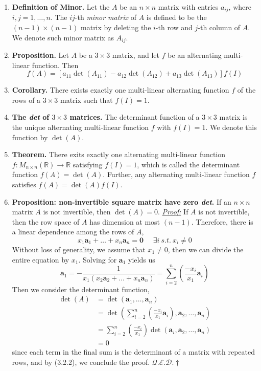\documentclass[oneside, 12pt]{book}
\newcommand{\settag}[1]{\renewcommand{\theenumi}{#1}}
\newcommand{\R}{\mathbb{R}}
\newcommand{\qed}{\hfill $\mathcal{Q}.\mathcal{E}.\mathcal{D}.\dagger$}
\newcommand{\tbf}[1]{\textbf{#1}}
\newcommand{\tit}[1]{\textit{#1}}
\newcommand{\proof}{\tit{\underline{Proof:}}} %
\newcommand{\trans}[3]{$#1:#2\rightarrow{}#3$}
\newcommand{\para}[1]{\item \tbf{#1}}
\newcommand{\va}{\mathbf{a}}
\newcommand{\vzero}{\mathbf{0}}
\begin{document}
\begin{enumerate}
    \settag{3.2.4}
    \para{Definition of Minor.} Let the $A$ be an $n\times n$ matrix with entries $a_{ij}$, where $i, j = 1, \ldots, n$. The $ij$-th \tit{minor matrix} of $A$ is defined to be the $(n-1) \times (n -1)$ matrix by deleting the $i$-th row and $j$-th column of $A$. We denote such minor matrix as $A_{ij}$.
    
    \settag{3.2.5}
    \para{Proposition.} Let $A$ be a $3 \times 3$ matrix, and let $f$ be an alternating multi-linear function. Then
    \begin{equation*}
        f(A) = \left[a_{11}\det(A_{11}) - a_{12}\det(A_{12}) + a_{13}\det(A_{13})\right]f(I)
    \end{equation*}
    
    \settag{3.2.6}
    \para{Corollary.} There exists exactly one multi-linear alternating function $f$ of the rows of a $3 \times 3$ matrix such that $f(I) = 1$.
    
    \settag{3.2.7}
    \para{The \tit{det} of $3 \times 3$ matrices.} The determinant function of a $3 \times 3$ matrix is the unique alternating multi-linear function $f$ with $f(I) = 1$. We denote this function by $\det{(A)}$.
    
    \settag{3.2.8}
    \para{Theorem.} There exits exactly one alternating multi-linear function \trans{f}{M_{n\times n}(\R)}{\R} satisfying $f(I) = 1$, which is called the determinant function $f(A) = \det(A)$. Further, any alternating multi-linear function $f$ satisfies $f(A) = \det(A)f(I)$.
    
    \settag{3.2.10}
    \para{Proposition: non-invertible square matrix have zero \tit{det}.} If an $n \times n$ matrix $A$ is not invertible, then $\det(A) = 0$. \newline
    \proof \newline
    If $A$ is not invertible, then the row space of $A$ has dimension at most $(n - 1)$. Therefore, there is a linear dependence among the rows of $A$, 
    \begin{equation*}
        x_1\va_1 + \ldots + x_n\va_n = \vzero~~~~~~\exists i~s.t.~ x_i \neq 0
    \end{equation*}
    Without loss of generality, we assume that $x_1 \neq 0$, then we can divide the entire equation by $x_1$. Solving for $\va_1$ yields us 
    \begin{equation*}
        \va_1 = -\frac{1}{x_1(x_2\va_2 + \ldots + x_n\va_n)} = \sum_{i = 2}^{n}\left(\frac{-x_i}{x_1}\va_i\right)
    \end{equation*}
    Then we consider the determinant function, 
    \begin{align*}
        \det(A) &= \det(\va_1,\ldots,\va_n) \\
        &= \det\left(\sum_{i = 2}^{n}\left(\frac{-x_i}{x_1}\va_i\right), \va_2, \ldots, \va_n\right) \\
        &= \sum_{i = 2}^{n} \left(\frac{-x_i}{x_1}\right)\det(\va_i, \va_2,\ldots,\va_n) \\
        &= 0
    \end{align*}
    since each term in the final sum is the determinant of a matrix with repeated rows, and by (3.2.2), we conclude the proof. \qed
    

\end{enumerate}
\end{document}
